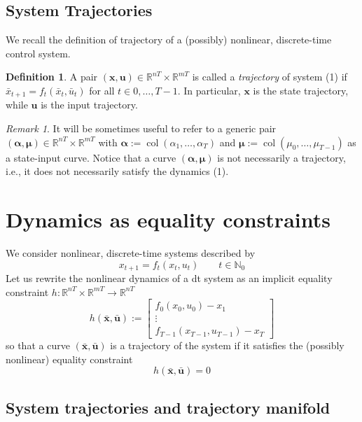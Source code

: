 \documentclass[openany]{book}
\DeclareMathOperator{\col}{col}           %
\newcommand{\R}{\mathbb{R}}               %
\newcommand{\N}{\mathbb{N}}               %
\newcommand{\traj}{(\bar{\mathbf{x}},\bar{\mathbf{u}})}  %
\theoremstyle{definition}
\newtheorem{definition}{Definition}[section]
\theoremstyle{remark}
\newtheorem*{remark}{Remark}
\begin{document}
\subsection{System Trajectories}
We recall the definition of trajectory of a (possibly) nonlinear, discrete-time control system.

\begin{definition}
A pair $(\mathbf{x}, \mathbf{u}) \in \R^{nT} \times \R^{mT}$ is called a \emph{trajectory} of system (1) if $\bar{x}_{t+1} = f_t(\bar{x}_t, \bar{u}_t)$ for all $t \in 0,\ldots,T-1$. In particular, $\mathbf{x}$ is the state trajectory, while $\mathbf{u}$ is the input trajectory.
\end{definition}

\begin{remark}
It will be sometimes useful to refer to a generic pair $(\boldsymbol{\alpha}, \boldsymbol{\mu}) \in \R^{nT} \times \R^{mT}$ with $\boldsymbol{\alpha} := \col(\alpha_1,\ldots,\alpha_T)$ and $\boldsymbol{\mu} := \col(\mu_0,\ldots,\mu_{T-1})$ as a state-input curve. Notice that a curve $(\boldsymbol{\alpha}, \boldsymbol{\mu})$ is not necessarily a trajectory, i.e., it does not necessarily satisfy the dynamics (1).
\end{remark}

\section{Dynamics as equality constraints}
We consider nonlinear, discrete-time systems described by 
\begin{equation} \label{system2}
    x_{t+1} = f_t(x_t,u_t) \qquad t\in\N_0
\end{equation}
Let us rewrite the nonlinear dynamics of a dt system as an implicit equality constraint $h:\R^{nT}\times \R^{mT}\to\R^{nT}$ 
\[
    h\traj:=\begin{bmatrix}
        f_0(x_0,u_0)-x_1 \\ \vdots \\ f_{T-1}(x_{T-1},u_{T-1})-x_T
    \end{bmatrix}
\]
so that a curve $\traj$ is a trajectory of the system if it satisfies the (possibly nonlinear) equality constraint 
\[
    h\traj = 0
\]

\subsection{System trajectories and trajectory manifold}
\end{document}
